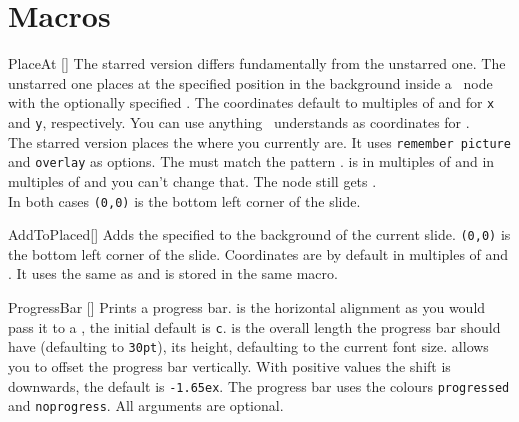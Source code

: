 \section{Macros}\label{sec:beam:macros}
\begin{describemacro}{PlaceAt}%
  [\meta{*}]
  The starred version differs fundamentally from the unstarred one. The
  unstarred one places  at the specified position  in
  the background inside a \TikZ\ node with the optionally specified . The coordinates default to multiples of  and
   for \texttt{x} and \texttt{y}, respectively. You can use
  anything \TikZ\ understands as coordinates for .\\[\parskip]
  The starred version places the  where you currently are. It
  uses \texttt{remember picture} and \texttt{overlay} as options. The 
  must match the pattern .  is in multiples of 
  and  in multiples of  and you can't change that. The
  node still gets .\\[\parskip]
  In both cases \texttt{(0,0)} is the bottom left corner of the slide.
\end{describemacro}

\begin{describemacro}{AddToPlaced}[]
  Adds the specified  to the background of the current slide.
  \texttt{(0,0)} is the bottom left corner of the slide. Coordinates are by
  default in multiples of  and . It uses the same
   as  and is stored in the same macro.
\end{describemacro}

\begin{describemacro}{ProgressBar}%
  []
  Prints a progress bar.  is the horizontal alignment as you would
  pass it to a , the initial default is \texttt{c}.  is
  the overall length the progress bar should have (defaulting to \texttt{30pt}),
   its height, defaulting to the current font size. 
  allows you to offset the progress bar vertically. With positive values the
  shift is downwards, the default is \texttt{-1.65ex}. The progress bar uses the
   colours \texttt{progressed} and \texttt{noprogress}. All
  arguments are optional.
\end{describemacro}


